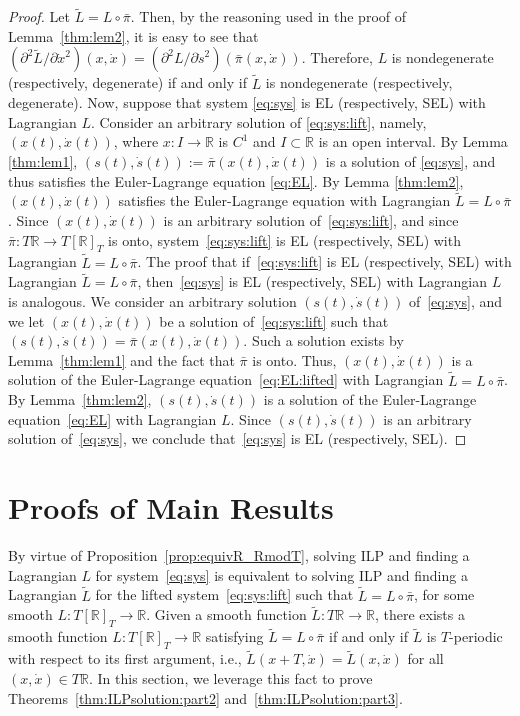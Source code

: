 \begin{proof}
	Let $\tilde L = L \circ \bar{\pi}$. Then, by the reasoning used in the
	proof of Lemma~\ref{thm:lem2}, it is easy to see that $(\partial^2
	\tilde L / \partial \dot x^2)(x,\dot x) = (\partial^2 L / \partial
	\dot s^2) (\bar{\pi}(x,\dot x))$.  Therefore, $L$ is nondegenerate
	(respectively, degenerate) if and only if $\tilde{L}$ is nondegenerate
	(respectively, degenerate). Now, suppose that system \eqref{eq:sys} is
	EL (respectively, SEL) with Lagrangian $L$. Consider an arbitrary
	solution of \eqref{eq:sys:lift}, namely, $(x(t),\dot{x}(t))$, where $x
	:I \to \mathbb{R}$ is $C^1$ and $I \subset \mathbb{R}$ is an open interval. By Lemma
	\ref{thm:lem1}, $(s(t),\dot s(t)):=\bar{\pi}(x(t),\dot{x}(t))$ is a
	solution of \eqref{eq:sys}, and thus satisfies the Euler-Lagrange
	equation \eqref{eq:EL}. By Lemma \ref{thm:lem2}, $(x(t),\dot{x}(t))$
	satisfies the Euler-Lagrange equation with Lagrangian
	$\tilde{L}=L\circ \bar{\pi}$. Since $( x(t), \dot x(t) )$ is an arbitrary
	solution of~\eqref{eq:sys:lift}, and since $\bar{\pi}: T \mathbb{R} \to T [\mathbb{R}]_T$
	is onto, system~\eqref{eq:sys:lift} is EL (respectively, SEL) with
	Lagrangian $\tilde{L}=L\circ \bar{\pi}$. The proof that
	if~\eqref{eq:sys:lift} is EL (respectively, SEL) with Lagrangian
	$\tilde{L}=L\circ \bar{\pi}$, then~\eqref{eq:sys} is EL (respectively, SEL)
	with Lagrangian $L$ is analogous. We consider an arbitrary solution
	$(s(t),\dot s(t))$ of~\eqref{eq:sys}, and we let $(x(t),\dot x(t))$ be
	a solution of~\eqref{eq:sys:lift} such that $(s(t),\dot s(t)) =
	\bar{\pi}(x(t),\dot x(t))$. Such a solution exists by Lemma~\ref{thm:lem1}
	and the fact that $\bar{\pi}$ is onto. Thus, $(x(t),\dot x(t))$ is a
	solution of the Euler-Lagrange equation~\eqref{eq:EL:lifted} with
	Lagrangian $\tilde L = L \circ \bar{\pi}$. By
	Lemma~\ref{thm:lem2}, $(s(t),\dot s(t))$ is a solution of the
	Euler-Lagrange equation~\eqref{eq:EL} with Lagrangian $L$. Since
	$(s(t),\dot s(t))$ is an arbitrary solution of~\eqref{eq:sys}, we
	conclude that~\eqref{eq:sys} is EL (respectively, SEL).
	\qquad\end{proof}
\section{Proofs of Main Results}
\label{subsec:virMass} 
By virtue of Proposition~\ref{prop:equivR_RmodT}, solving ILP and
finding a Lagrangian $L$ for system~\eqref{eq:sys} is equivalent to
solving ILP and finding a Lagrangian $\tilde{L}$ for the lifted
system~\eqref{eq:sys:lift} such that $\tilde L = L \circ \bar{\pi}$, for
some smooth $L: T [\mathbb{R}]_T \to \mathbb{R}$. Given a smooth function $\tilde L
: T\mathbb{R} \to \mathbb{R}$, there exists a smooth function $L : T [\mathbb{R}]_T \to
\mathbb{R}$ satisfying $\tilde L = L \circ \bar{\pi}$ if and only if $\tilde L$ is
$T$-periodic with respect to its first argument, i.e., $\tilde
L(x+T,\dot x) = \tilde L(x,\dot x)$ for all $(x,\dot x) \in T\mathbb{R}$. In
this section, we leverage this fact to prove
Theorems~\ref{thm:ILPsolution:part2} and~\ref{thm:ILPsolution:part3}.

